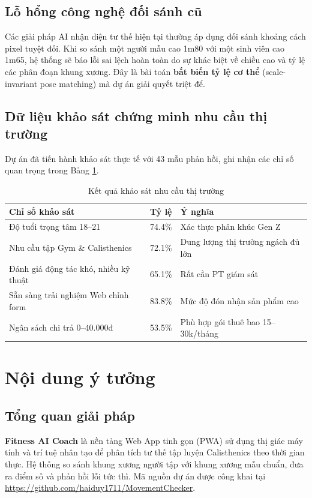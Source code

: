\documentclass[a4paper,12pt]{article}
\begin{document}
\subsection{Lỗ hổng công nghệ đối sánh cũ}
Các giải pháp AI nhận diện tư thế hiện tại thường áp dụng đối sánh khoảng cách pixel tuyệt đối. Khi so sánh một người mẫu cao 1m80 với một sinh viên cao 1m65, hệ thống sẽ báo lỗi sai lệch hoàn toàn do sự khác biệt về chiều cao và tỷ lệ các phân đoạn khung xương. Đây là bài toán \textbf{bất biến tỷ lệ cơ thể} (scale-invariant pose matching) mà dự án giải quyết triệt để.

\subsection{Dữ liệu khảo sát chứng minh nhu cầu thị trường}
Dự án đã tiến hành khảo sát thực tế với 43 mẫu phản hồi, ghi nhận các chỉ số quan trọng trong Bảng \ref{tab:survey}.

\begin{table}[H]
    \centering
    \caption{Kết quả khảo sát nhu cầu thị trường}
    \label{tab:survey}
    \begin{tabular}{p{7cm}p{2.5cm}p{5cm}}
        \toprule
        \textbf{Chỉ số khảo sát} & \textbf{Tỷ lệ} & \textbf{Ý nghĩa} \\
        \midrule
        Độ tuổi trọng tâm 18--21 & 74.4\% & Xác thực phân khúc Gen Z \\
        Nhu cầu tập Gym \& Calisthenics & 72.1\% & Dung lượng thị trường ngách đủ lớn \\
        Đánh giá động tác khó, nhiều kỹ thuật & 65.1\% & Rất cần PT giám sát \\
        Sẵn sàng trải nghiệm Web chỉnh form & 83.8\% & Mức độ đón nhận sản phẩm cao \\
        Ngân sách chi trả 0--40.000đ & 53.5\% & Phù hợp gói thuê bao 15--30k/tháng \\
        \bottomrule
    \end{tabular}
\end{table}

\section{Nội dung ý tưởng}

\subsection{Tổng quan giải pháp}
\textbf{Fitness AI Coach} là nền tảng Web App tinh gọn (PWA) sử dụng thị giác máy tính và trí tuệ nhân tạo để phân tích tư thế tập luyện Calisthenics theo thời gian thực. Hệ thống so sánh khung xương người tập với khung xương mẫu chuẩn, đưa ra điểm số và phản hồi lỗi tức thì. Mã nguồn dự án được công khai tại \url{https://github.com/haiduy1711/MovementChecker}.
\end{document}
